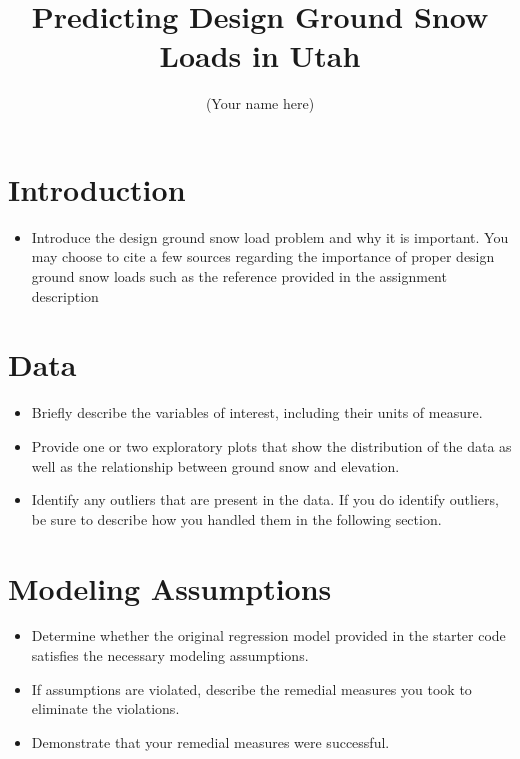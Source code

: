 \documentclass[11pt]{article}
\title{Predicting Design Ground Snow Loads in Utah}
\author{(Your name here)}
\begin{document}
\maketitle



\section{Introduction}

\begin{itemize}
\item Introduce the design ground snow load problem and why it is important. You may choose to cite a few sources regarding the importance of proper design ground snow loads such as the reference provided in the assignment description \citep{Arcement2017}
\end{itemize}

\section{Data}
\begin{itemize}
\item Briefly describe the variables of interest, including their units of measure. 
\item Provide one or two exploratory plots that show the distribution of the data as well as the relationship between ground snow and elevation. 
\item Identify any outliers that are present in the data. If you do identify outliers, be sure to describe how you handled them in the following section. 
\end{itemize}

\section{Modeling Assumptions}
\begin{itemize}
\item Determine whether the original regression model provided in the starter code satisfies the necessary modeling assumptions. 
\item If assumptions are violated, describe the remedial measures you took to eliminate the violations. 
\item Demonstrate that your remedial measures were successful. 
\end{itemize}
\end{document}
